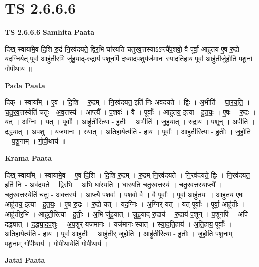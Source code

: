 \documentclass[17pt]{extarticle}
\begin{document}
\section*{ TS 2.6.6.6 }

\textbf{TS 2.6.6.6 } \newline
\textbf{Samhita Paata} \newline

दिख् स्वाया॑मे॒व दि॒शि रु॒द्रं नि॒रव॑दयते॒ द्विर॒भि घा॑रयति चतुरव॒त्तस्याऽऽप्त्यै॑प॒शवो॒ वै पूर्वा॒ आहु॑तय ए॒ष रु॒द्रो यद॒ग्निर्यत् पूर्वा॒ आहु॑तीर॒भि जु॑हु॒याद्-रु॒द्राय॑ प॒शूनपि॑ दध्यादप॒शुर्यज॑मानः स्यादति॒हाय॒ पूर्वा॒ आहु॑तीर्जुहोति पशू॒नां गो॑पी॒थाय॑ ॥ \newline

\textbf{Pada Paata} \newline

दिक् । स्वाया᳚म् । ए॒व । दि॒शि । रु॒द्रम् । नि॒रव॑दयत॒ इति॑ निः-अव॑दयते । द्विः । अ॒भीति॑ । घा॒र॒य॒ति॒ । च॒तु॒र॒व॒त्तस्येति॑ चतुः - अ॒व॒त्तस्य॑ । आप्त्यै᳚ । प॒शवः॑ । वै । पूर्वाः᳚ । आहु॑तय॒ इत्या - हु॒त॒यः॒ । ए॒षः । रु॒द्रः । यत् । अ॒ग्निः । यत् । पूर्वाः᳚ । आहु॑ती॒रित्या - हु॒तीः॒ । अ॒भीति॑ । जु॒हु॒यात् । रु॒द्राय॑ । प॒शून् । अपीति॑ । द॒द्ध्या॒त् । अ॒प॒शुः । यज॑मानः । स्या॒त् । अ॒ति॒हायेत्य॑ति - हाय॑ । पूर्वाः᳚ । आहु॑ती॒रित्या - हु॒तीः॒ । जु॒हो॒ति॒ । प॒शू॒नाम् । गो॒पी॒थाय॑ ॥  \newline


\textbf{Krama Paata} \newline

दिख् स्वाया᳚म् । स्वाया॑मे॒व । ए॒व दि॒शि । दि॒शि रु॒द्रम् । रु॒द्रम् नि॒रव॑दयते । नि॒रव॑दयते॒ द्विः । नि॒रव॑दयत॒ इति॑ निः - अव॑दयते । द्विर॒भि । अ॒भि घा॑रयति । घा॒र॒य॒ति॒ च॒तु॒र॒व॒त्तस्य॑ । च॒तु॒र॒व॒त्तस्याप्त्यै᳚ । च॒तु॒र॒व॒त्तस्येति॑ चतुः - अ॒व॒त्तस्य॑ । आप्त्यै॑ प॒शवः॑ । प॒शवो॒ वै । वै पूर्वाः᳚ । पूर्वा॒ आहु॑तयः । आहु॑तय ए॒षः । आहु॑तय॒ इत्या - हु॒त॒यः॒ । ए॒ष रु॒द्रः । रु॒द्रो यत् । यद॒ग्निः । अ॒ग्निर् यत् । यत् पूर्वाः᳚ । पूर्वा॒ आहु॑तीः । आहु॑तीर॒भि । आहु॑ती॒रित्या - हु॒तीः॒ । अ॒भि जु॑हु॒यात् । जु॒हु॒याद् रु॒द्राय॑ । रु॒द्राय॑ प॒शून् । प॒शूनपि॑ । अपि॑ दद्ध्यात् । द॒द्ध्या॒द॒प॒शुः । अ॒प॒शुर् यज॑मानः । यज॑मानः स्यात् । स्या॒द॒ति॒हाय॑ । अ॒ति॒हाय॒ पूर्वाः᳚ । अ॒ति॒हायेत्य॑ति - हाय॑ । पूर्वा॒ आहु॑तीः । आहु॑तीर् जुहोति । आहु॑ती॒रित्या - हु॒तीः॒ । जु॒हो॒ति॒ प॒शू॒नाम् । प॒शू॒नाम् गो॑पी॒थाय॑ । गो॒पी॒थायेति॑ गोपी॒थाय॑ । \newline

\textbf{Jatai Paata} \newline
\end{document}

